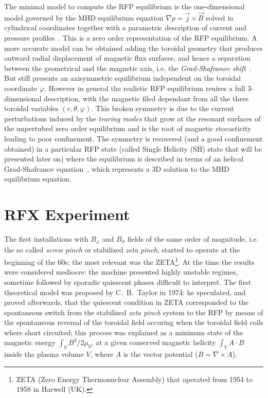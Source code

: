 The minimal model to compute the RFP equilibrium is the one-dimensional model governed by the MHD equilibrium equation $\nabla p = \Vec{j} \times \Vec{B}$ solved in cylindrical coordinates together with a parametric description of current and pressure profiles~\cite{Bonomo33}.
This is a zero order representation of the RFP equilibrium.
A more accurate model can be obtained adding the toroidal geometry that produces outward radial displacement of magnetic flux surfaces, and hence a separation between the geometrical and the magnetic axis, i.e. the \textit{Grad-Shafranov shift}~\cite{freidberg2014ideal}. But still presents an axisymmetric equilibrium independent on the toroidal coordinate $\varphi$. However in general the realistic RFP equilibrium reuires a full 3-dimensional description, with the magnetic filed dependant from all the three toroidal variables $(r,\theta,\varphi)$. This broken symmetry is due to the current perturbations induced by the \emph{tearing modes} that grow at the resonant surfaces of the unpertubed zero order equilibrium and is the root of magnetic stocasticity leading to poor confinement.
The symmetry is recovered (and a good confinement obtained) in a particular RFP state (called Single Helicity (SH) state that will be presented later on) where the equilibrium is described in terms of an helical Grad-Shafranov equation~\cite{Bonomo35, Bonomo36}, which represents a 3D solution to the MHD equilibrium equation.

\section{RFX Experiment}
The first installations with $B_\varphi$ and $B_\vartheta$ fields of the same order of magnitude, i.e. the so called \textit{screw pinch} or stabilized \textit{zeta pinch}, started to operate at the beginning of the 60s; the most relevant was the ZETA\footnote{ZETA (Zero Energy Thermonuclear Assembly) that operated from 1954 to 1958 in Harwell (UK).}. At the time the results were considered mediocre: the machine presented highly unstable regimes, sometime followed by sporadic quiescent phases difficult to interpret. The first theoretical model was proposed by C.~B.~Taylor in 1974\cite{taylor}: he speculated, and proved afterwards, that the quiescent condition in ZETA corresponded to the spontaneous switch from the stabilized \textit{zeta pinch} system to the RFP by means of the spontaneous reversal of the toroidal field occuring when the toroidal field coils where short circuited; this process was explained as a minimum state of the magnetic energy $\int_V B^2/2\mu_0$, at a given conserved magnetic helicity $\int_V A \cdot B $ inside the plasma volume $V$, where $A$ is the vector potential ($B=\nabla \times A $).

